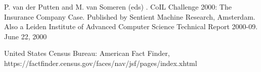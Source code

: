 \documentclass[12pt]{article}
\begin{document}
\begin{thebibliography}{9}

P. van der Putten and M. van Someren (eds) . CoIL Challenge 2000: The Insurance Company Case. Published by Sentient Machine Research, Amsterdam. Also a Leiden Institute of Advanced Computer Science Technical Report 2000-09. June 22, 2000

United States Census Bureau: American Fact Finder,\\ https://factfinder.census.gov/faces/nav/jsf/pages/index.xhtml

\end{thebibliography}
\end{document}

